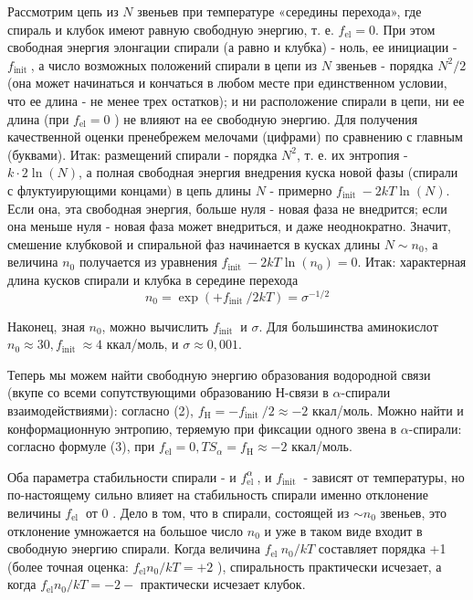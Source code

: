 \documentclass[
11pt,%
tightenlines,%
twoside,%
onecolumn,%
nofloats,%
nobibnotes,%
nofootinbib,%
superscriptaddress,%
noshowpacs,%
centertags]%
{revtex4}
\begin{document}
Рассмотрим цепь из $N$ звеньев при температуре «середины перехода», где спираль и клубок имеют равную свободную энергию, т. е. $f_{\mathrm{el}}=0$. При этом свободная энергия элонгации спирали (а равно и клубка) - ноль, ее инициации - $f_{\text {init }}$, а число возможных положений спирали в цепи из $N$ звеньев - порядка $N^2 / 2$ (она может начинаться и кончаться в любом месте при единственном условии, что ее длина - не менее трех остатков); и ни расположение спирали в цепи, ни ее длина (при $f_{\mathrm{el}}=0$ ) не влияют на ее свободную энергию. Для получения качественной оценки пренебрежем мелочами (цифрами) по сравнению с главным (буквами). Итак: размещений спирали - порядка $N^2$, т. е. их энтропия - $k \cdot 2 \ln (N)$, а полная свободная энергия внедрения куска новой фазы (спирали с флуктуирующими концами) в цепь длины $N$ - примерно $f_{\text {init }}-2 k T \ln (N)$. Если она, эта свободная энергия, больше нуля - новая фаза не внедрится; если она меньше нуля - новая фаза может внедриться, и даже неоднократно. Значит, смешение клубковой и спиральной фаз начинается в кусках длины $N \sim n_0$, а величина $n_0$ получается из уравнения $f_{\text {init }}-2 k T \ln \left(n_0\right)=0$. Итак: характерная длина кусков спирали и клубка в середине перехода
\begin{equation}
	n_0=\exp \left(+f_{\text {init }} / 2 k T\right)=\sigma^{-1 / 2}
\end{equation}

Наконец, зная $n_0$, можно вычислить $f_{\text {init }}$ и $\sigma$. Для большинства аминокислот $n_0 \approx 30, f_{\text {init }} \approx 4$ ккал/моль, и $\sigma \approx 0,001$.

Теперь мы можем найти свободную энергию образования водородной связи (вкупе со всеми сопутствующими образованию Н-связи в $\alpha$-спирали взаимодействиями): согласно (2), $f_{\mathrm{H}}=-f_{\text {init }} / 2 \approx-2$ ккал/моль. Можно найти и конформационную энтропию, теряемую при фиксации одного звена в $\alpha$-спирали: согласно формуле (3), при $f_{\mathrm{el}}=0, T S_\alpha=f_{\mathrm{H}} \approx-2$ ккал/моль.

Оба параметра стабильности спирали - и $f_{\text {el }}^\alpha$, и $f_{\text {init }}$ - зависят от температуры, но по-настоящему сильно влияет на стабильность спирали именно отклонение величины $f_{\text {el }}$ от 0 . Дело в том, что в спирали, состоящей из $\sim n_0$ звеньев, это отклонение умножается на большое число $n_0$ и уже в таком виде входит в свободную энергию спирали. Когда величина $f_{\text {el }} n_0 / k T$ составляет порядка +1 (более точная оценка: $f_{\mathrm{el}} n_0 / k T=+2$ ), спиральность практически исчезает, а когда $f_{\mathrm{el}} n_0 / k T=-2-$ практически исчезает клубок. 
\end{document}
